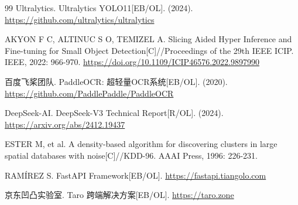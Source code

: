 \documentclass[UTF8, a4paper, fontset=ubuntu]{ctexart}
\begin{document}
\begin{thebibliography}{99}
 Ultralytics. Ultralytics YOLO11[EB/OL]. (2024). \url{https://github.com/ultralytics/ultralytics}

 AKYON F C, ALTINUC S O, TEMIZEL A. Slicing Aided Hyper Inference and Fine-tuning for Small Object Detection[C]//Proceedings of the 29th IEEE ICIP. IEEE, 2022: 966-970. \url{https://doi.org/10.1109/ICIP46576.2022.9897990}

 百度飞桨团队. PaddleOCR: 超轻量OCR系统[EB/OL]. (2020). \url{https://github.com/PaddlePaddle/PaddleOCR}

 DeepSeek-AI. DeepSeek-V3 Technical Report[R/OL]. (2024). \url{https://arxiv.org/abs/2412.19437}

 ESTER M, et al. A density-based algorithm for discovering clusters in large spatial databases with noise[C]//KDD-96. AAAI Press, 1996: 226-231.

 RAMÍREZ S. FastAPI Framework[EB/OL]. \url{https://fastapi.tiangolo.com}

 京东凹凸实验室. Taro 跨端解决方案[EB/OL]. \url{https://taro.zone}

\end{thebibliography}
\end{document}
